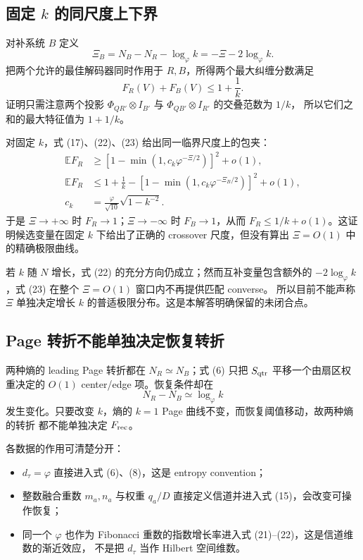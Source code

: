 \documentclass[UTF8,11pt,a4paper]{ctexart}
\theoremstyle{definition}
\newcommand{\E}{\mathbb E}
\newcommand{\phiG}{\varphi}
\begin{document}
\subsection{固定 \texorpdfstring{$k$}{k} 的同尺度上下界}

对补系统 $B$ 定义
\[
\Xi_B=N_B-N_R-\log_{\phiG}k=-\Xi-2\log_{\phiG}k.
\]
把两个允许的最佳解码器同时作用于 $R,B$，所得两个最大纠缠分数满足
\begin{equation}
F_R(V)+F_B(V)\le1+\frac1k.                                        \tag{23}
\end{equation}
证明只需注意两个投影
$\Phi_{Q R'}\otimes I_{B'}$ 与 $\Phi_{Q B'}\otimes I_{R'}$ 的交叠范数为 $1/k$，
所以它们之和的最大特征值为 $1+1/k$。

对固定 $k$，式 (17)、(22)、(23) 给出同一临界尺度上的包夹：
\begin{equation}
\begin{aligned}
\E F_R&\ge [1-\min(1,c_k\phiG^{-\Xi/2})]^2+o(1),\\
\E F_R&\le1+\frac1k-[1-\min(1,c_k\phiG^{-\Xi_B/2})]^2+o(1),\\
c_k&=\frac{\phiG}{\sqrt{10}}\sqrt{1-k^{-2}}.
\end{aligned}                                                        \tag{24}
\end{equation}
于是 $\Xi\to+\infty$ 时 $F_R\to1$；$\Xi\to-\infty$ 时
$F_B\to1$，从而 $F_R\le1/k+o(1)$。这证明候选变量在固定 $k$ 下给出了正确的
crossover 尺度，但没有算出 $\Xi=O(1)$ 中的精确极限曲线。

若 $k$ 随 $N$ 增长，式 (22) 的充分方向仍成立；然而互补变量包含额外的
$-2\log_{\phiG}k$，式 (23) 在整个 $\Xi=O(1)$ 窗口内不再提供匹配 converse。
所以目前不能声称 $\Xi$ 单独决定增长 $k$ 的普适极限分布。这是本解答明确保留的未闭合点。

\subsection{Page 转折不能单独决定恢复转折}

两种熵的 leading Page 转折都在 $N_R\simeq N_B$；式 (6) 只把
$S_{\rm qtr}$ 平移一个由扇区权重决定的 $O(1)$ center/edge 项。恢复条件却在
\[
N_R-N_B\simeq\log_{\phiG}k
\]
发生变化。只要改变 $k$，熵的 $k=1$ Page 曲线不变，而恢复阈值移动，故两种熵的转折
都不能单独决定 $F_{\rm rec}$。

各数据的作用可清楚分开：
\begin{itemize}
\item $d_\tau=\phiG$ 直接进入式 (6)、(8)，这是 entropy convention；
\item 整数融合重数 $m_a,n_a$ 与权重 $q_a/D$ 直接定义信道并进入式 (15)，会改变可操作恢复；
\item 同一个 $\phiG$ 也作为 Fibonacci 重数的指数增长率进入式 (21)--(22)，这是信道维数的渐近效应，
不是把 $d_\tau$ 当作 Hilbert 空间维数。
\end{itemize}
\end{document}
